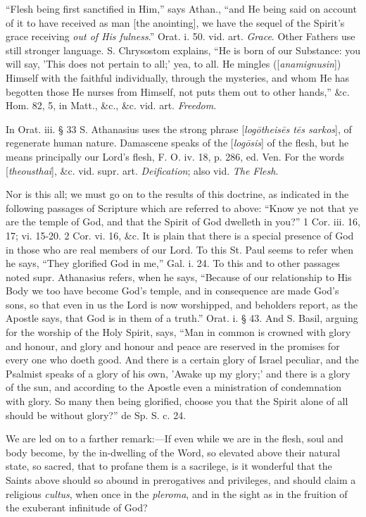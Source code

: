 ``Flesh being first sanctified in Him,'' says Athan.,
``and He being said on account of it to have received as man [the
anointing], we have the sequel of the Spirit's grace receiving \emph{out
of His fulness}.'' Orat. i. 50. vid. art. \emph{Grace}. Other
Fathers use still stronger language. S. Chrysostom explains, ``He is
born of our Substance: you will say, 'This does not pertain to all;'
yea, to all. He mingles ([\emph{anamignusin}]) Himself with the
faithful individually, through the mysteries, and whom He has begotten
those He nurses from Himself, not puts them out to other hands,''
\&c. Hom. 82, 5, in Matt., \&c., \&c. vid. art. \emph{Freedom}.

In Orat. iii. § 33 S. Athanasius uses the strong
phrase [\emph{log\={o}theis\={e}s t\={e}s sarkos}], of
regenerate human nature. Damascene speaks of the [\emph{log\={o}sis}]
of the flesh, but he means principally our Lord's flesh, F. O. iv. 18,
p. 286, ed. Ven. For the words [\emph{theousthai}], \&c. vid. supr.
art. \emph{Deification}; also vid. \emph{The Flesh}.

Nor is this all; we must go on to the results of
this doctrine, as indicated in the following passages of Scripture
which are referred to above: ``Know ye not that ye are the temple of
God, and that the Spirit of God dwelleth in you?'' 1 Cor. iii. 16, 17;
vi. 15-20. 2 Cor. vi. 16, \&c. It is plain that there is a special
presence of God in those who are real members of our Lord. To
this St. Paul seems to refer when he says, ``They glorified God in me,''
Gal. i. 24. To this and to other passages noted supr. Athanasius
refers, when he says, ``Because of our relationship to His Body we too
have become God's temple, and in consequence are made God's sons, so
that even in us the Lord is now worshipped, and beholders report, as
the Apostle says, that God is in them of a truth.'' Orat. i. § 43. And
S. Basil, arguing for the worship of the Holy Spirit, says, ``Man in
common is crowned with glory and honour, and glory and honour and
peace are reserved in the promises for every one who doeth good. And
there is a certain glory of Israel peculiar, and the Psalmist speaks
of a glory of his own, 'Awake up my glory;' and there is a glory of
the sun, and according to the Apostle even a ministration of
condemnation with glory. So many then being glorified, choose you that
the Spirit alone of all should be without glory?'' de Sp. S. c. 24.

We are led on to a farther remark:—If even
while we are in the flesh, soul and body become, by the in-dwelling of
the Word, so elevated above their natural state, so sacred, that to
profane them is a sacrilege, is it wonderful that the Saints above
should so abound in prerogatives and privileges, and should claim a
religious \emph{cultus}, when once in the \emph{pleroma}, and in the
sight as in the fruition of the exuberant infinitude of God?

